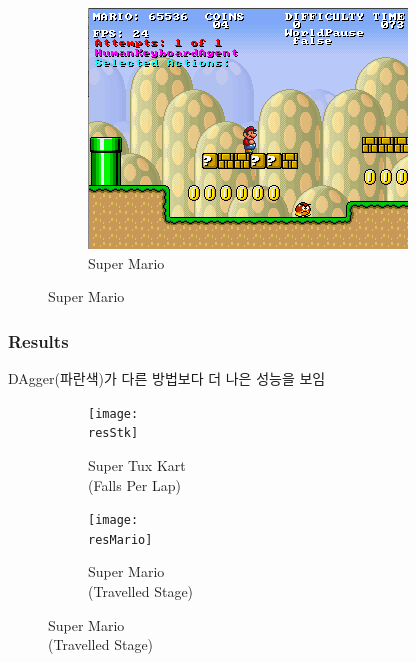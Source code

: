 \documentclass[11pt,xcolor={dvipsnames},hyperref={pdftex,pdfpagemode=UseNone,hidelinks,pdfdisplaydoctitle=true},usepdftitle=false]{beamer}
\newcommand{\resStk}{figs/result_stk.pdf}
\newcommand{\resMario}{figs/mario-result.pdf}
\begin{document}
\begin{frame}
\begin{figure}
\begin{subfigure}[b]{0.3\textwidth}
        \includegraphics[width=\textwidth]{figs/mario.png}
        \caption{Super Mario}
        \label{fig:mario}
    \end{subfigure}
\end{figure}
\end{frame}

\begin{frame}
\frametitle{Results}

DAgger(파란색)가 다른 방법보다 더 나은 성능을 보임

\begin{figure}
    \centering
    \captionsetup[subfigure]{position=above, justification=centering}
    \begin{subfigure}{0.45\textwidth}
        \centering
        \texttt{[image: \\resStk]}
        \vspace{-15mm}
        \caption{Super Tux Kart \\ (Falls Per Lap)}
        \label{fig:resStk}
    \end{subfigure}
    \hfill
    \begin{subfigure}{0.45\textwidth}
        \centering
        \texttt{[image: \\resMario]}
        \vspace{-15mm}
        \caption{Super Mario \\ (Travelled Stage)}
        \label{fig:resMario}
    \end{subfigure}
    \label{fig:results}
\end{figure}

\end{frame}
\end{document}
